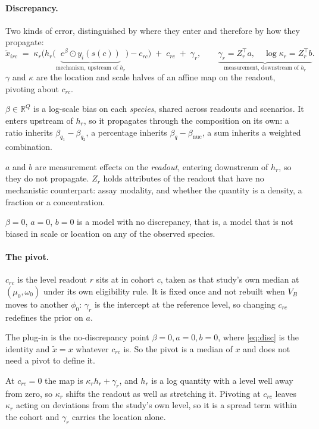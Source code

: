 \documentclass[11pt]{article}
\newcommand{\Tr}{^{\!\top}}
\begin{document}
\paragraph{Discrepancy.} Two kinds of error, distinguished by where they enter
and therefore by how they propagate:
\begin{equation}
\tilde x_{irc}
\;=\;
\kappa_r\Big(h_r\big(
\underbrace{e^{\beta}\odot y_i(s(c))}_{\text{mechanism, upstream of }h_r}
\big) - c_{rc}\Big)
\;+\; c_{rc} \;+\;
\gamma_r ,
\qquad
\underbrace{\gamma_r = Z_r\Tr a,
\quad
\log\kappa_r = Z_r\Tr b}_{\text{measurement, downstream of }h_r} .
\label{eq:disc}
\end{equation}
$\gamma$ and $\kappa$ are the location and scale halves of an affine map on the
readout, pivoting about $c_{rc}$.

$\beta\in\mathbb{R}^Q$ is a log-scale bias on each \emph{species}, shared across
readouts and scenarios. It enters upstream of $h_r$, so it propagates through the
composition on its own: a ratio inherits $\beta_{q_1}-\beta_{q_2}$, a percentage
inherits $\beta_q - \beta_{\text{nuc}}$, a sum inherits a weighted combination.

$a$ and $b$ are measurement effects on the \emph{readout}, entering downstream of
$h_r$, so they do not propagate. $Z_r$ holds attributes of the readout that have
no mechanistic counterpart: assay modality, and whether the quantity is a
density, a fraction or a concentration.

$\beta=0$, $a=0$, $b=0$ is a model with no discrepancy, that is, a model that is not biased in scale or location on any of the observed species.

\paragraph{The pivot.} $c_{rc}$ is the level readout $r$ sits at in cohort $c$,
taken as that study's own median at $(\mu_0,\omega_0)$ under its own eligibility
rule. It is fixed once and not rebuilt when $V_B$ moves to another $\phi_0$:
$\gamma_r$ is the intercept at the reference level, so changing $c_{rc}$
redefines the prior on $a$.

The plug-in is the no-discrepancy point $\beta=0,a=0,b=0$, where
\eqref{eq:disc} is the identity and $\tilde x = x$ whatever $c_{rc}$ is. So the
pivot is a median of $x$ and does not need a pivot to define it.

At $c_{rc}=0$ the map is $\kappa_r h_r + \gamma_r$, and $h_r$ is a log quantity
with a level well away from zero, so $\kappa_r$ shifts the readout as well as
stretching it. Pivoting at $c_{rc}$ leaves $\kappa_r$ acting on deviations from
the study's own level, so it is a spread term within the cohort and $\gamma_r$
carries the location alone.
\end{document}
